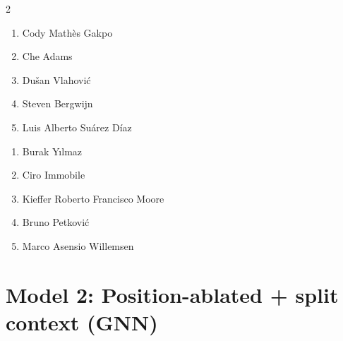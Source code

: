 \documentclass[11pt]{article}
\begin{document}
\begin{multicols}{2}
\begin{samepage}
\begin{tcolorbox}[evalbox,title=\textbf{Lionel Messi (Right Center Forward)} \hfill Score:\ \rule{1cm}{0.4pt}]
\begin{enumerate}
\item Cody Mathès Gakpo
\item Che Adams
\item Dušan Vlahović
\item Steven Bergwijn
\item Luis Alberto Suárez Díaz
\end{enumerate}
\end{tcolorbox}
\end{samepage}

\begin{samepage}
\begin{tcolorbox}[evalbox,title=\textbf{Kylian Mbappé (Left Wing)} \hfill Score:\ \rule{1cm}{0.4pt}]
\begin{enumerate}
\item Burak Yılmaz
\item Ciro Immobile
\item Kieffer Roberto Francisco Moore
\item Bruno Petković
\item Marco Asensio Willemsen
\end{enumerate}
\end{tcolorbox}
\end{samepage}

\end{multicols}

\section*{Model 2: Position-ablated + split context (GNN)}
\end{document}
